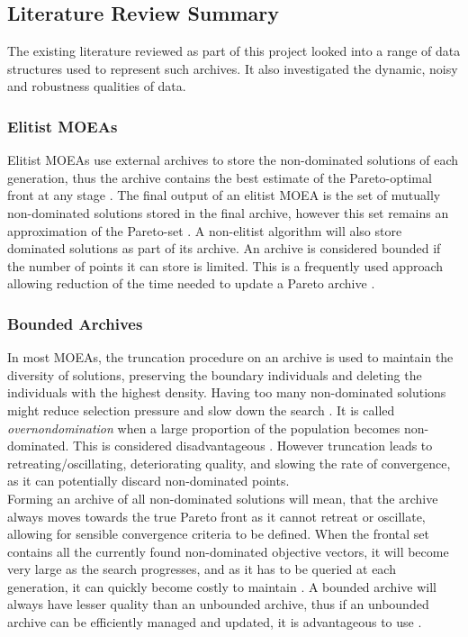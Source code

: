 \documentclass{ecmm427_assignment}
\begin{document}
\subsection{Literature Review Summary}
\label{literature}
The existing literature reviewed as part of this project looked into a range of data structures used to represent such archives. It also investigated the dynamic, noisy and robustness qualities of data.

\subsubsection{Elitist MOEAs}
Elitist MOEAs use external archives to store the non-dominated solutions of each generation, thus the archive contains the best estimate of the Pareto-optimal front at any stage \cite{Altwaijry2012} \cite{Everson2002}. The final output of an elitist MOEA is the set of mutually non-dominated solutions stored in the final archive, however this set remains an approximation of the Pareto-set \cite{Mostaghim2005}. A non-elitist algorithm will also store dominated solutions as part of its archive. An archive is considered bounded if the number of points it can store is limited. This is a frequently used approach allowing reduction of the time needed to update a Pareto archive \cite{Yuen2012}.

\subsubsection{Bounded Archives}
In most MOEAs, the truncation procedure on an archive is used to maintain the diversity of solutions, preserving the boundary individuals and deleting the individuals with the highest density. Having too many non-dominated solutions might reduce selection pressure and slow down the search \cite{Li2008}. It is called \textsl{overnondomination} when a large proportion of the population becomes non-dominated. This is considered disadvantageous \cite{Drozdik2015}. However truncation leads to retreating/oscillating, deteriorating quality, and slowing the rate of convergence, as it can potentially discard non-dominated points. 
\\Forming an archive of all non-dominated solutions will mean, that the archive always moves towards the true Pareto front as it cannot retreat or oscillate, allowing for sensible convergence criteria to be defined. When the frontal set contains all the currently found non-dominated objective vectors, it will become very large as the search progresses, and as it has to be queried at each generation, it can quickly become costly to maintain \cite{Everson2002} \cite{Schutze2003}. A bounded archive will always have lesser quality than an unbounded archive, thus if an unbounded archive can be efficiently managed and updated, it is advantageous to use \cite{Jaszkiewicz2016}.
\end{document}
